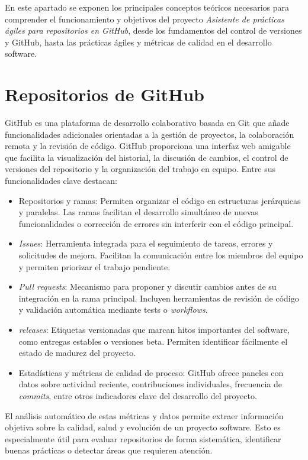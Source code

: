 
En este apartado se exponen los principales conceptos teóricos necesarios para comprender el funcionamiento y objetivos del proyecto \textit{Asistente de prácticas ágiles para repositorios en GitHub}, desde los fundamentos del control de versiones y GitHub, hasta las prácticas ágiles y métricas de calidad en el desarrollo software.

\section{Repositorios de GitHub}

GitHub es una plataforma de desarrollo colaborativo basada en Git que añade funcionalidades adicionales orientadas a la gestión de proyectos, la colaboración remota y la revisión de código. GitHub proporciona una interfaz web amigable que facilita la visualización del historial, la discusión de cambios, el control de versiones del repositorio y la organización del trabajo en equipo. Entre sus funcionalidades clave destacan:

\begin{itemize}
\item Repositorios y ramas: Permiten organizar el código en estructuras jerárquicas y paralelas. Las ramas facilitan el desarrollo simultáneo de nuevas funcionalidades o corrección de errores sin interferir con el código principal.
\item \textit{Issues}: Herramienta integrada para el seguimiento de tareas, errores y solicitudes de mejora. Facilitan la comunicación entre los miembros del equipo y permiten priorizar el trabajo pendiente.
\item \textit{Pull requests}: Mecanismo para proponer y discutir cambios antes de su integración en la rama principal. Incluyen herramientas de revisión de código y validación automática mediante tests o \textit{workflows}.
\item \textit{releases}: Etiquetas versionadas que marcan hitos importantes del software, como entregas estables o versiones beta. Permiten identificar fácilmente el estado de madurez del proyecto.
\item Estadísticas y métricas de calidad de proceso: GitHub ofrece paneles con datos sobre actividad reciente, contribuciones individuales, frecuencia de \textit{commits}, entre otros indicadores clave del desarrollo del proyecto.
\end{itemize}

El análisis automático de estas métricas y datos permite extraer información objetiva sobre la calidad, salud y evolución de un proyecto software. Esto es especialmente útil para evaluar repositorios de forma sistemática, identificar buenas prácticas o detectar áreas que requieren atención.

